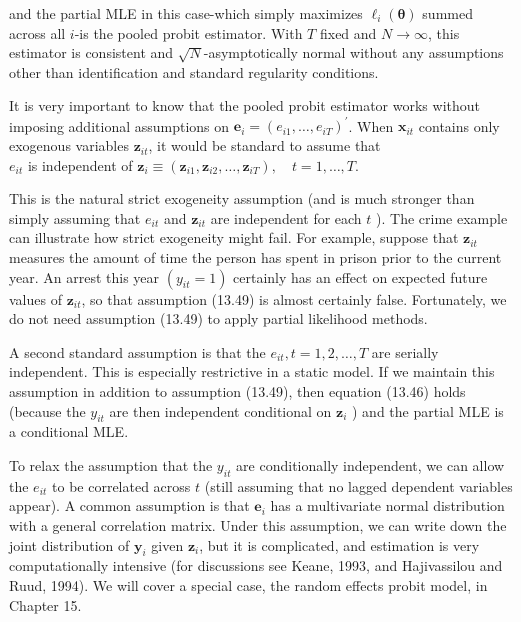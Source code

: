 \documentclass[10pt]{article}
\begin{document}
and the partial MLE in this case-which simply maximizes $\ell_{i}(\boldsymbol{\theta})$ summed across all $i$-is the pooled probit estimator. With $T$ fixed and $N \rightarrow \infty$, this estimator is consistent and $\sqrt{N}$-asymptotically normal without any assumptions other than identification and standard regularity conditions.

It is very important to know that the pooled probit estimator works without imposing additional assumptions on $\mathbf{e}_{i}=\left(e_{i 1}, \ldots, e_{i T}\right)^{\prime}$. When $\mathbf{x}_{i t}$ contains only exogenous variables $\mathbf{z}_{i t}$, it would be standard to assume that\\
$e_{i t}$ is independent of $\mathbf{z}_{i} \equiv\left(\mathbf{z}_{i 1}, \mathbf{z}_{i 2}, \ldots, \mathbf{z}_{i T}\right), \quad t=1, \ldots, T$.

This is the natural strict exogeneity assumption (and is much stronger than simply assuming that $e_{i t}$ and $\mathbf{z}_{i t}$ are independent for each $t$ ). The crime example can illustrate how strict exogeneity might fail. For example, suppose that $\mathbf{z}_{i t}$ measures the amount of time the person has spent in prison prior to the current year. An arrest this year $\left(y_{i t}=1\right)$ certainly has an effect on expected future values of $\mathbf{z}_{i t}$, so that assumption (13.49) is almost certainly false. Fortunately, we do not need assumption (13.49) to apply partial likelihood methods.

A second standard assumption is that the $e_{i t}, t=1,2, \ldots, T$ are serially independent. This is especially restrictive in a static model. If we maintain this assumption in addition to assumption (13.49), then equation (13.46) holds (because the $y_{i t}$ are then independent conditional on $\mathbf{z}_{i}$ ) and the partial MLE is a conditional MLE.

To relax the assumption that the $y_{i t}$ are conditionally independent, we can allow the $e_{i t}$ to be correlated across $t$ (still assuming that no lagged dependent variables appear). A common assumption is that $\mathbf{e}_{i}$ has a multivariate normal distribution with a general correlation matrix. Under this assumption, we can write down the joint distribution of $\mathbf{y}_{i}$ given $\mathbf{z}_{i}$, but it is complicated, and estimation is very computationally intensive (for discussions see Keane, 1993, and Hajivassilou and Ruud, 1994). We will cover a special case, the random effects probit model, in Chapter 15.
\end{document}
